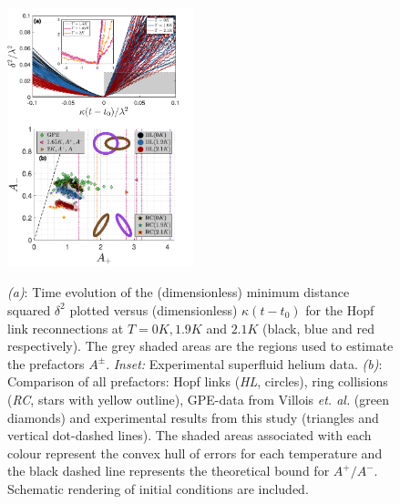 \documentclass[9pt,twocolumn,twoside]{pnas-new}
\begin{document}
\begin{figure}[t]
	\centering
	\includegraphics*[width=0.48\textwidth]{minimum_distances_combined.pdf}

\begin{subcaptiongroup*}
	\label{fig:minimum-distance}
	\label{fig:prefactors}
\end{subcaptiongroup*}	
\caption{\emph{(a)}: Time evolution of the (dimensionless)
minimum distance squared $\delta^2$ plotted versus (dimensionless) $\kappa (t-t_0)$ for
the Hopf link reconnections at $T=0K,1.9K$ and $2.1K$ (black, blue and red
respectively). The grey shaded areas
are the regions used to estimate the prefactors $A^{\pm}$. 
\emph{Inset:} Experimental superfluid helium data.
\emph{(b)}: Comparison of all prefactors: Hopf links (\emph{HL}, circles), 
ring collisions (\emph{RC}, stars with yellow outline), GPE-data 
from Villois \emph{et. al.} \cite{villoisIrreversibleDynamicsVortex2020} (green diamonds) and experimental results from this study (triangles and vertical dot-dashed lines). 
The shaded areas associated with each colour represent the convex hull of errors 
for each temperature and the black dashed line represents the theoretical bound for $A^+/A^-$. Schematic rendering of initial conditions are included.}
\label{fig:min-dist-prefactor}
\end{figure}
\end{document}
